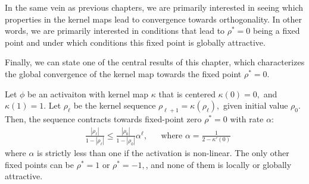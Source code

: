 In the same vein as previous chapters, we are primarily interested in seeing which properties in the kernel maps lead to convergence towards orthogonality. In other words, we are primarily interested in conditions that lead to $\rho^*=0$ being a fixed point and under which conditions this fixed point is globally attractive. 








Finally, we can state one of the central results of this chapter, which characterizes the global convergence of the kernel map towards the fixed point $\rho^*=0.$

\begin{theorem}\label{iso:thm:global_attract}
Let $\phi$ be an activaiton with kernel map $\kappa$ that is centered $\kappa(0)=0,$ and $\kappa(1)=1.$ Let $\rho_\ell$ be the kernel sequence $\rho_{\ell+1}=\kappa(\rho_\ell),$ given initial value $\rho_0.$ Then, the sequence contracts towards fixed-point zero $\rho^*=0$ with rate $\alpha$:
    \begin{align}
        &\frac{|\rho_\ell|}{1-|\rho_\ell|} \le \frac{|\rho_0|}{1-|\rho_0|}\alpha^{\ell}, && \text{where } \alpha = \frac{1}{2-\kappa'(0)}
    \end{align}
 where $\alpha$ is strictly less than one if the activation is non-linear. The only other fixed points can be $\rho^*=1$ or $\rho^*=-1,$, and none of them is locally or globally attractive.
\end{theorem}

